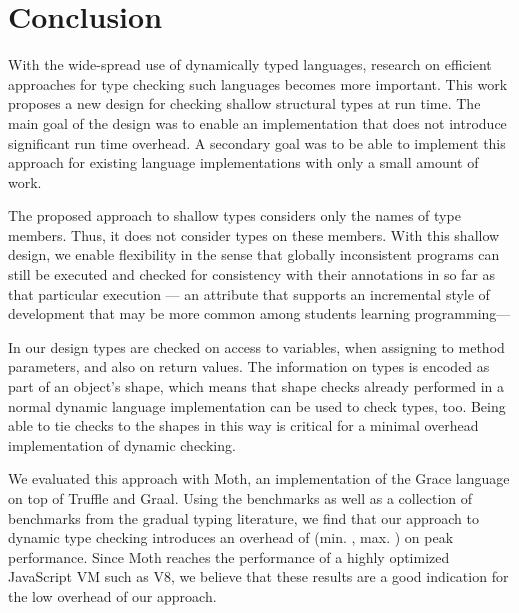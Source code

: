 
\section{Conclusion}
\label{sec:conclusion}

With the wide-spread use of dynamically typed languages,
research on efficient approaches for type checking
such languages becomes more important.
%
This work proposes a new design for checking shallow structural
types at run time.
The main goal of the design was to enable an implementation that
does not introduce significant run time overhead.
A secondary goal was to be able to implement this approach for
existing language implementations with only a small amount of work.


The proposed approach to shallow types considers only the names of type members.
Thus, it does not consider types on these members.
With this shallow design, we enable flexibility in the sense that
globally inconsistent programs can still be executed and
checked for consistency with their annotations in so far as
that particular execution%
--- an attribute that supports an incremental style of development
that may be more common among students learning programming---%

In our design types are checked on access to variables,
when assigning to method parameters, and also on return values.
The information on types is encoded as part of an object's shape,
which means that shape checks already performed in a normal dynamic
language implementation can be used to check types, too. 
Being able to tie checks to the shapes in this way is critical for 
a minimal overhead implementation of dynamic checking.

We evaluated this approach with Moth, an implementation of the Grace language
on top of Truffle and Graal.
Using the \AWFY benchmarks as well as a collection of benchmarks from the
gradual typing literature, we find that our approach to dynamic type checking
introduces an overhead of 
\OverheadTypingGMeanP (min. \OverheadTypingMinP, max. \OverheadTypingMaxP)
on peak performance.
Since Moth reaches the performance of a
highly optimized JavaScript VM such as V8,
we believe that these results are a good indication
for the low overhead of our approach.

